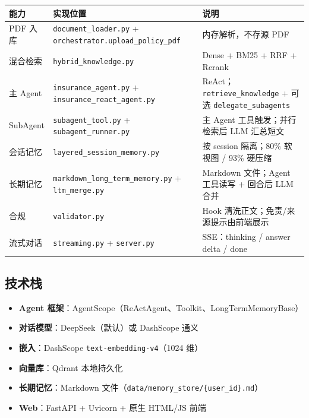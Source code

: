 \documentclass[11pt,a4paper]{ctexart}
\begin{document}
\begin{center}
\begin{tabular}{p{2.2cm}p{4.5cm}p{7cm}}
\toprule
\textbf{能力} & \textbf{实现位置} & \textbf{说明} \\
\midrule
PDF 入库 & \texttt{document\_loader.py} + \texttt{orchestrator.upload\_policy\_pdf} & 内存解析，不存源 PDF \\
混合检索 & \texttt{hybrid\_knowledge.py} & Dense + BM25 + RRF + Rerank \\
主 Agent & \texttt{insurance\_agent.py} + \texttt{insurance\_react\_agent.py} & ReAct；\texttt{retrieve\_knowledge} + 可选 \texttt{delegate\_subagents} \\
SubAgent & \texttt{subagent\_tool.py} + \texttt{subagent\_runner.py} & 主 Agent 工具触发；并行检索后 LLM 汇总短文 \\
会话记忆 & \texttt{layered\_session\_memory.py} & 按 session 隔离；80\% 软视图 / 93\% 硬压缩 \\
长期记忆 & \texttt{markdown\_long\_term\_memory.py} + \texttt{ltm\_merge.py} & Markdown 文件；Agent 工具读写 + 回合后 LLM 合并 \\
合规 & \texttt{validator.py} & Hook 清洗正文；免责/来源提示由前端展示 \\
流式对话 & \texttt{streaming.py} + \texttt{server.py} & SSE：thinking / answer delta / done \\
\bottomrule
\end{tabular}
\end{center}

\subsection{技术栈}

\begin{itemize}[nosep]
  \item \textbf{Agent 框架}：AgentScope（ReActAgent、Toolkit、LongTermMemoryBase）
  \item \textbf{对话模型}：DeepSeek（默认）或 DashScope 通义
  \item \textbf{嵌入}：DashScope \texttt{text-embedding-v4}（1024 维）
  \item \textbf{向量库}：Qdrant 本地持久化
  \item \textbf{长期记忆}：Markdown 文件（\texttt{data/memory\_store/\{user\_id\}.md}）
  \item \textbf{Web}：FastAPI + Uvicorn + 原生 HTML/JS 前端
\end{itemize}
\end{document}
